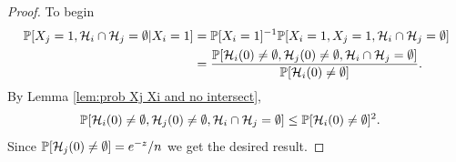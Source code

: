 	\begin{proof}
		To begin
		\begin{align}
			\mathbb{P}[X_j = 1, \mathcal{H}_i \cap\mathcal{H}_j = \emptyset|X_i = 1] &= \mathbb{P}[X_i = 1]^{-1}\mathbb{P}[X_i = 1, X_j = 1, \mathcal{H}_i \cap\mathcal{H}_j = \emptyset]\\
			&= \frac{\mathbb{P}[\mathcal{H}_i(0) \neq \emptyset, \mathcal{H}_j(0) \neq \emptyset, \mathcal{H}_i \cap \mathcal{H}_j = \emptyset]}{\mathbb{P}[\mathcal{H}_i(0) \neq \emptyset]}.
		\end{align}
		By Lemma \ref{lem:prob Xj Xi and no intersect},
		\begin{align}
			\mathbb{P}[\mathcal{H}_i(0) \neq \emptyset, \mathcal{H}_j(0) \neq \emptyset, \mathcal{H}_i \cap \mathcal{H}_j = \emptyset] 
			&\leq \mathbb{P}[\mathcal{H}_i(0) \neq \emptyset]^2.
		\end{align} 
		Since $\mathbb{P}[\mathcal{H}_j(0) \neq \emptyset] = e^{-z}/n$ we get the desired result.
	\end{proof}

